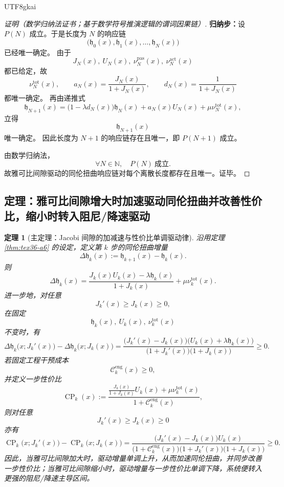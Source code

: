 \documentclass[12pt]{article}
\newtheorem{theorem}{定理}[section]
\newcommand{\NN}{\mathbb{N}}
\begin{document}
\begin{CJK*}{UTF8}{gkai}
\begin{proof}[证明（数学归纳法证书；基于数学符号推演逻辑的谓词因果链）]
\textbf{归纳步：}设 $P(N)$ 成立。于是长度为 $N$ 的响应链
\[
  \bigl(\mathfrak h_0(x),\mathfrak h_1(x),\ldots,\mathfrak h_N(x)\bigr)
\]
已经唯一确定。
由于
\[
  J_N(x),\ U_N(x),\ \nu_N^{\mathrm{pas}}(x),\ \nu_N^{\mathrm{act}}(x)
\]
都已给定，故
\[
  \nu_N^{\mathrm{tot}}(x),
  \qquad
  a_N(x)=\frac{J_N(x)}{1+J_N(x)},
  \qquad
  d_N(x)=\frac{1}{1+J_N(x)}
\]
都唯一确定。
再由递推式
\[
  \mathfrak h_{N+1}(x)
  =
  \bigl(1-\lambda d_N(x)\bigr)\mathfrak h_N(x)
  +
  a_N(x)U_N(x)
  +
  \mu \nu_N^{\mathrm{tot}}(x),
\]
立得
\[
  \mathfrak h_{N+1}(x)
\]
唯一确定。
因此长度为 $N+1$ 的响应链存在且唯一，即 $P(N+1)$ 成立。

由数学归纳法，
\[
  \forall N\in\NN,\quad P(N)\ \text{成立}.
\]
故雅可比间隙驱动的同伦扭曲响应链对每个离散长度都存在且唯一。证毕。
\end{proof}

\subsection{定理：雅可比间隙增大时加速驱动同伦扭曲并改善性价比，缩小时转入阻尼/降速驱动}
\label{subsec:tex36-jac-gap-acceleration}

\begin{theorem}[主定理：Jacobi 间隙的加减速与性价比单调驱动律]
\label{thm:tex36-jac-gap-accel}
沿用定理 \ref{thm:tex36-a6} 的设定，定义第 $k$ 步的同伦扭曲增量
\[
  \Delta \mathfrak h_k(x)
  :=
  \mathfrak h_{k+1}(x)-\mathfrak h_k(x).
\]
则
\[
  \Delta \mathfrak h_k(x)
  =
  \frac{J_k(x)U_k(x)-\lambda \mathfrak h_k(x)}{1+J_k(x)}
  +
  \mu \nu_k^{\mathrm{tot}}(x).
\]
进一步地，对任意
\[
  J_k'(x)\ge J_k(x)\ge 0,
\]
在固定
\[
  \mathfrak h_k(x),\ U_k(x),\ \nu_k^{\mathrm{tot}}(x)
\]
不变时，有
\[
  \Delta \mathfrak h_k\bigl(x;J_k'(x)\bigr)
  -
  \Delta \mathfrak h_k\bigl(x;J_k(x)\bigr)
  =
  \frac{
    \bigl(J_k'(x)-J_k(x)\bigr)\bigl(U_k(x)+\lambda \mathfrak h_k(x)\bigr)
  }{
    \bigl(1+J_k'(x)\bigr)\bigl(1+J_k(x)\bigr)
  }
  \ge 0.
\]
若固定工程干预成本
\[
  \mathcal C_k^{\mathrm{eng}}(x)\ge 0,
\]
并定义一步性价比
\[
  \operatorname{CP}_k(x)
  :=
  \frac{
    \frac{J_k(x)}{1+J_k(x)}U_k(x)+\mu \nu_k^{\mathrm{tot}}(x)
  }{
    1+\mathcal C_k^{\mathrm{eng}}(x)
  },
\]
则对任意
\[
  J_k'(x)\ge J_k(x)\ge 0
\]
亦有
\[
  \operatorname{CP}_k\bigl(x;J_k'(x)\bigr)
  -
  \operatorname{CP}_k\bigl(x;J_k(x)\bigr)
  =
  \frac{
    \bigl(J_k'(x)-J_k(x)\bigr)U_k(x)
  }{
    \bigl(1+\mathcal C_k^{\mathrm{eng}}(x)\bigr)\bigl(1+J_k'(x)\bigr)\bigl(1+J_k(x)\bigr)
  }
  \ge 0.
\]
因此，当雅可比间隙加大时，驱动增量单调上升，从而加速同伦扭曲，并同步改善一步性价比；当雅可比间隙缩小时，驱动增量与一步性价比单调下降，系统便转入更强的阻尼/降速主导区间。
\end{theorem}


\end{CJK*}
\end{document}

